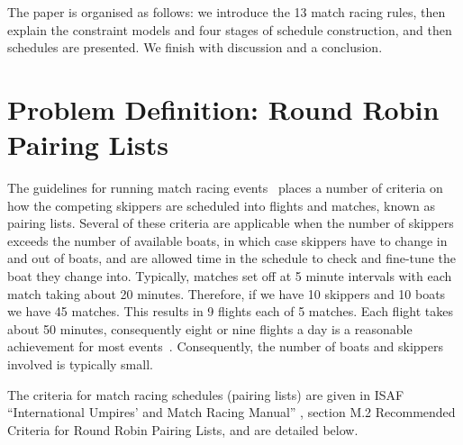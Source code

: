 \documentclass{llncs}
\begin{document}
The paper is organised as follows: we introduce the 13 match racing rules, then explain the
constraint models and four stages of schedule construction, and then schedules are presented. We
finish with discussion and a conclusion.

\section{Problem Definition: Round Robin Pairing Lists}\label{sec:definition}

The guidelines for running match racing events~\cite{isaf} places a number of criteria on how the
competing skippers are scheduled into flights and matches, known as pairing lists. Several of these
criteria are applicable when the number of skippers exceeds the number of available boats, in which
case skippers have to change in and out of boats, and are allowed time in the schedule to check and
fine-tune the boat they change into. Typically, matches set off at 5 minute intervals with each
match taking about 20 minutes. Therefore, if we have 10 skippers and 10 boats we have 45 matches.
This results in 9 flights each of 5 matches.  Each flight takes about 50 minutes, consequently eight
or nine flights a day is a reasonable achievement for most events~\cite{isaf}. Consequently, the
number of boats and skippers involved is typically small.

The criteria for  match racing schedules (pairing lists) are given in ISAF ``International Umpires'
and Match Racing Manual'' \cite{isaf}, section M.2 Recommended Criteria for Round Robin Pairing
Lists, and are detailed below.
\end{document}
